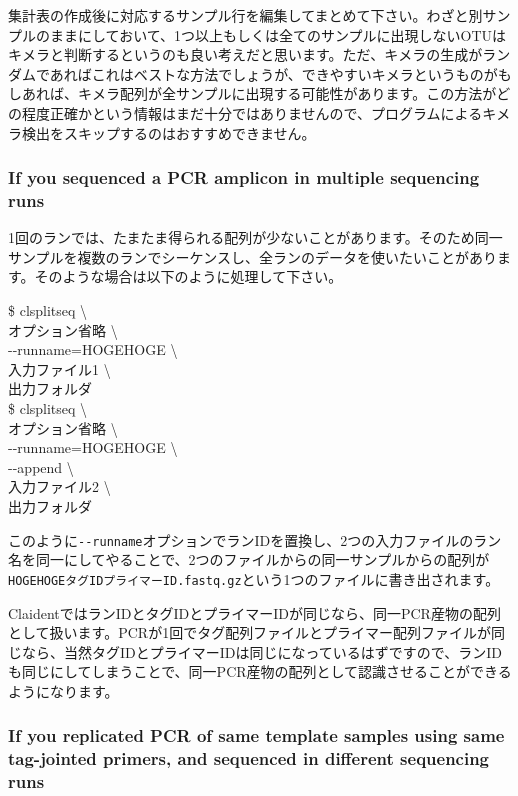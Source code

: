 \documentclass[titlepage,10pt,a4paper,english]{jsbook}
\newenvironment{cmd}{\begin{oframed}\raggedright\ttfamily\footnotesize\setlength{\baselineskip}{1.4em}}{\end{oframed}\vspace{-1em}}
\begin{document}
集計表の作成後に対応するサンプル行を編集してまとめて下さい。わざと別サンプルのままにしておいて、1つ以上もしくは全てのサンプルに出現しないOTUはキメラと判断するというのも良い考えだと思います。ただ、キメラの生成がランダムであればこれはベストな方法でしょうが、できやすいキメラというものがもしあれば、キメラ配列が全サンプルに出現する可能性があります。この方法がどの程度正確かという情報はまだ十分ではありませんので、プログラムによるキメラ検出をスキップするのはおすすめできません。

\subsubsection{If you sequenced a PCR amplicon in multiple sequencing runs}

1回のランでは、たまたま得られる配列が少ないことがあります。そのため同一サンプルを複数のランでシーケンスし、全ランのデータを使いたいことがあります。そのような場合は以下のように処理して下さい。
\begin{cmd}
\$ clsplitseq {\textbackslash}\\
オプション省略 {\textbackslash}\\
{-}{-}runname=HOGEHOGE {\textbackslash}\\
入力ファイル1 {\textbackslash}\\
出力フォルダ\\
\$ clsplitseq {\textbackslash}\\
オプション省略 {\textbackslash}\\
{-}{-}runname=HOGEHOGE {\textbackslash}\\
{-}{-}append {\textbackslash}\\
入力ファイル2 {\textbackslash}\\
出力フォルダ
\end{cmd}
このように\texttt{{-}{-}runname}オプションでランIDを置換し、2つの入力ファイルのラン名を同一にしてやることで、2つのファイルからの同一サンプルからの配列が\texttt{HOGEHOGE{\textunderscore}{\textunderscore}タグID{\textunderscore}{\textunderscore}プライマーID.fastq.gz}という1つのファイルに書き出されます。

ClaidentではランIDとタグIDとプライマーIDが同じなら、同一PCR産物の配列として扱います。PCRが1回でタグ配列ファイルとプライマー配列ファイルが同じなら、当然タグIDとプライマーIDは同じになっているはずですので、ランIDも同じにしてしまうことで、同一PCR産物の配列として認識させることができるようになります。

\subsubsection{If you replicated PCR of same template samples using same tag-jointed primers, and sequenced in different sequencing runs}
\end{document}
